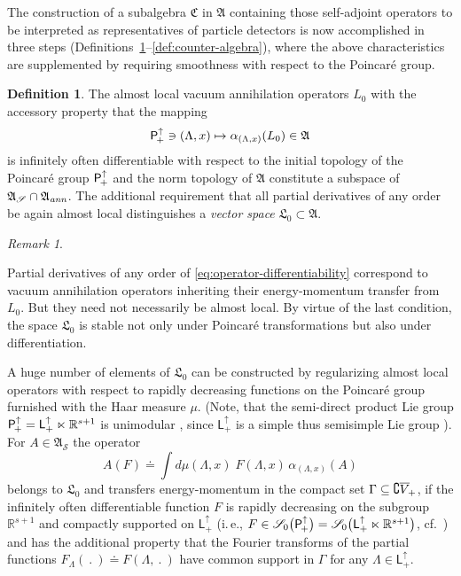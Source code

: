 \documentclass[a4paper,a4paper]{article}
\numberwithin{equation}{section}
\newcommand{\Afrak}{\mathfrak{A}}
\newcommand{\Cfrak}{\mathfrak{C}}
\newcommand{\Lfrak}{\mathfrak{L}}
\newcommand{\Sscr}{\mathscr{S}}
\newcommand{\Rsone}{\mathbb{R}^{s + 1}}
\newcommand{\AS}{\mathfrak{A}_{\mathscr{S}}}
\newcommand{\Aann}{\mathfrak{A}_{\text{\itshape ann}}}
\newcommand{\Lor}{\mathsf{L}_+^\uparrow}
\newcommand{\Poin}{\mathsf{P}_{\negthinspace +}^\uparrow}
\newcommand{\fwcone}{\overline{V}_{\negthinspace +}}
\newcommand{\aLax}{\alpha_{( \Lambda , x )}}
\newcounter{remitem}
\newenvironment{remlist}{\begin{list}{(\roman{remitem})}%
  {\usecounter{remitem} \setlength{\topsep}{0ex}%
   \setlength{\parsep}{0.2ex} \setlength{\itemsep}{0.4ex}%
   \setlength{\leftmargin}{0em} \setlength{\itemindent}{0.5em}%
   }}{\end{list}}
\theoremstyle{definition}
\newtheorem{definition}{Definition}[section]
\theoremstyle{plain}
\theoremstyle{remark}
\newtheorem*{remark*}{Remark}
\begin{document}
  The construction of a subalgebra $\Cfrak$ in $\Afrak$ containing
  those self-adjoint operators to be interpreted as representatives of
  particle detectors is now accomplished in three steps
  (Definitions~\ref{def:annihilator-space}--\ref{def:counter-algebra}),
  where the above characteristics are supplemented by requiring
  smoothness with respect to the Poincar\'e group.
  \begin{definition}
    \label{def:annihilator-space}
    The almost local vacuum annihilation operators $L_0$ with the
    accessory property that the mapping
    \begin{equation}
      \label{eq:operator-differentiability}
      \Poin \ni ( \Lambda , x ) \mapsto \aLax ( L_0 ) \in \Afrak
    \end{equation}
    is infinitely often differentiable with respect to the initial
    topology of the Poincar\'e group $\Poin$ and the norm topology of
    $\Afrak$ constitute a subspace of $\AS \cap \Aann$. The additional
    requirement that all partial derivatives of any order be again
    almost local distinguishes a \emph{vector space} $\Lfrak_0
    \subset \Afrak$.
  \end{definition}
  \begin{remark*}
    \begin{remlist}
    \item Partial derivatives of any order of
      \eqref{eq:operator-differentiability} correspond to vacuum
      annihilation operators inheriting their energy-momentum transfer
      from $L_0$. But they need not necessarily be almost local. By
      virtue of the last condition, the space $\Lfrak_0$ is stable not
      only under Poincar\'e transformations but also under
      differentiation.
    \item A huge number of elements of $\Lfrak_0$ can be constructed
      by regularizing almost local operators with respect to rapidly
      decreasing functions on the Poincar\'e group furnished with the
      Haar measure $\mu$. (Note, that the semi-direct product Lie
      group $\Poin = \Lor \ltimes \Rsone$ is unimodular
      \cite[Proposition~II.29 and Corollary]{nachbin:1965}, since
      $\Lor$ is a simple thus semisimple Lie group
      \cite[Proposition~I.1.6]{helgason:1984}). For $A \in \AS$ the
      operator
      \begin{equation}
        \label{eq:regularized-annihilator}
        A ( F ) \doteq \int d \mu ( \Lambda , x ) \; F ( \Lambda , x )
        \, \aLax ( A )
      \end{equation}
      belongs to $\Lfrak_0$ and transfers energy-momentum in the
      compact set $\Gamma \subseteq \complement \fwcone$, if the
      infinitely often differentiable function $F$ is rapidly
      decreasing on the subgroup $\Rsone$ and compactly supported on
      $\Lor$ (i.\,e., $F \in \Sscr_0 \bigl( \Poin \bigr) = \Sscr_0
            \bigl( \Lor \ltimes \Rsone \bigr)$,
      cf.~\cite{baumgaertel/wollenberg:1992}) and has the additional
      property that the Fourier transforms of the partial functions
      $F_\Lambda (~.~) \doteq F ( \Lambda ,~.~)$ have common support
      in $\Gamma$ for any $\Lambda \in \Lor$.
    \end{remlist}
  \end{remark*}
\end{document}
